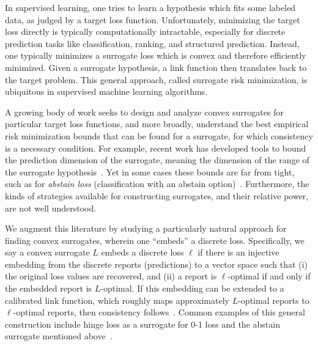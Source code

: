 \documentclass[11pt]{article}
\begin{document}
In supervised learning, one tries to learn a hypothesis which fits some labeled data, as judged by a target loss function.
Unfortunately, minimizing the target loss directly is typically computationally intractable, especially for discrete prediction tasks like classification, ranking, and structured prediction.
Instead, one typically minimizes a surrogate loss which is convex and therefore efficiently minimized.
Given a surrogate hypothesis, a link function then translates back to the target problem.
This general approach, called surrogate risk minimization, is ubiquitous in supervised machine learning algorithms.

A growing body of work seeks to design and analyze convex surrogates for particular target loss functions, and more broadly, understand the best empirical risk minimization bounds that can be found for a surrogate, for which consistency is a necessary condition.
For example, recent work has developed tools to bound the prediction dimension of the surrogate, meaning the dimension of the range of the surrogate hypothesis~\cite{frongillo2015elicitation,  ramaswamy2016convex}.
Yet in some cases these bounds are far from tight, such as for \emph{abstain loss} (classification with an abstain option)~\citep{bartlett2008classification,yuan2010classification,ramaswamy2016convex,ramaswamy2018consistent,zhang2018reject}.
Furthermore, the kinds of strategies available for constructing surrogates, and their relative power, are not well understood.

We augment this literature by studying a particularly natural approach for finding convex surrogates, wherein one ``embeds'' a discrete loss.
Specifically, we say a convex surrogate $L$ embeds a discrete loss $\ell$ if there is an injective embedding from the discrete reports (predictions) to a vector space such that (i) the original loss values are recovered, and (ii) a report is $\ell$-optimal if and only if the embedded report is $L$-optimal.
If this embedding can be extended to a calibrated link function, which roughly maps approximately $L$-optimal reports to $\ell$-optimal reports, then consistency follows~\citep{agarwal2015consistent}.
Common examples of this general construction include hinge loss as a surrogate for 0-1 loss and the abstain surrogate mentioned above~\citep{ramaswamy2018consistent}.


\end{document}
